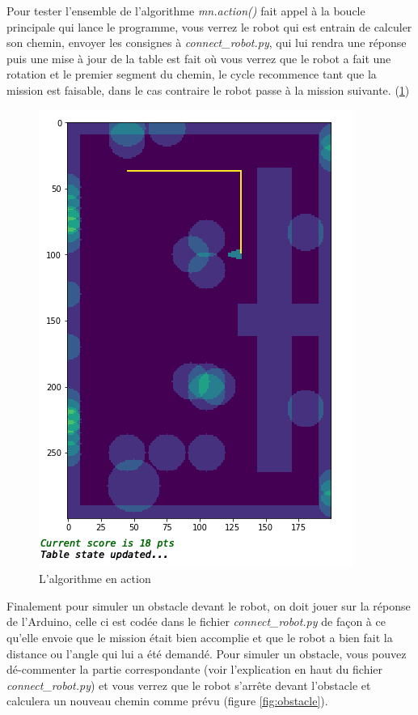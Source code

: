 \documentclass{article}
\begin{document}
Pour tester l'ensemble de l'algorithme \textit{mn.action()} fait appel à la boucle principale qui lance le programme, vous verrez le robot qui est entrain de calculer son chemin, envoyer les consignes à \textit{connect\_robot.py}, qui lui rendra une réponse puis une mise à jour de la table est fait où vous verrez que le robot a fait une rotation et le premier segment du chemin, le cycle recommence tant que la mission est faisable, dans le cas contraire le robot passe à la mission suivante. (\ref{fig:tests3})

\begin{figure}[!h]
\centering
\includegraphics[scale=0.6]{tests3}
\caption{L'algorithme en action}
\label{fig:tests3}
\end{figure}

Finalement pour simuler un obstacle devant le robot, on doit jouer sur la réponse de l'Arduino, celle ci est codée dans le fichier \textit{connect\_robot.py} de façon à ce qu'elle envoie que le mission était bien accomplie et que le robot a bien fait la distance ou l'angle qui lui a été demandé. Pour simuler un obstacle, vous pouvez dé-commenter la partie correspondante (voir l'explication en haut du fichier \textit{connect\_robot.py}) et vous verrez que le robot s'arrête devant l'obstacle et calculera un nouveau chemin comme prévu (figure \ref{fig:obstacle}).
\end{document}
